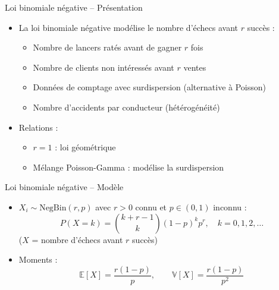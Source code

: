 \documentclass[11pt,aspectratio=169]{beamer}
\begin{document}
\begin{frame}{Loi binomiale négative -- Présentation}

\begin{itemize}

\item La loi binomiale négative modélise le nombre d'échecs avant $r$ succès :\newline
  \begin{itemize}
    \item Nombre de lancers ratés avant de gagner $r$ fois\newline
    \item Nombre de clients non intéressés avant $r$ ventes\newline
    \item Données de comptage avec surdispersion (alternative à Poisson)\newline
    \item Nombre d'accidents par conducteur (hétérogénéité)\newline
  \end{itemize}

\item Relations :\newline
  \begin{itemize}
    \item $r = 1$ : loi géométrique\newline
    \item Mélange Poisson-Gamma : modélise la surdispersion
  \end{itemize}

\end{itemize}

\end{frame}

\begin{frame}{Loi binomiale négative -- Modèle}

\begin{itemize}

\item $X_i \sim \text{NegBin}(r, p)$ avec $r > 0$ connu et $p \in (0,1)$ inconnu :
  \[
  P(X = k) = \binom{k + r - 1}{k}(1-p)^k p^r, \quad k = 0, 1, 2, \ldots
  \]
  ($X$ = nombre d'échecs avant $r$ succès)\newline

\item Moments :
  \[
  \mathbb{E}[X] = \frac{r(1-p)}{p}, \qquad \mathbb{V}[X] = \frac{r(1-p)}{p^2}
  \]

\end{itemize}

\end{frame}
\end{document}

